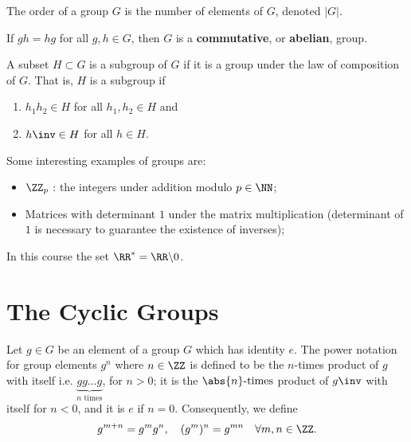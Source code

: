 \documentclass[12pt, a4paper]{article}
\begin{document}
\begin{definition}
    The order of a group \(G\) is the number of elements of \(G\), denoted \(\left|G\right|\).
\end{definition}

\begin{definition}
    If \(gh=hg\) for all \(g,h \in G\), then \(G\) is a \textbf{commutative}, or \textbf{abelian}, group.
\end{definition}

\begin{definition}
    A subset \(H \subset G\) is a subgroup of \(G\) if it is a group under the law of composition of \(G\). That is, \(H\) is a subgroup if 
    \begin{enumerate}
        \item \(h_1h_2 \in H\) for all \(h_1,h_2 \in H\) and
        \item \(h\inv \in H\) for all \(h \in H\).
    \end{enumerate}
\end{definition}

\begin{mdexample}
    Some interesting examples of groups are:
    \begin{itemize}
        \item \(\ZZ_p\) : the integers under addition modulo \(p \in \NN\);
        \item Matrices with determinant \(1\) under the matrix multiplication (determinant of \(1\) is necessary to guarantee the existence of inverses);
    \end{itemize}
\end{mdexample}

\begin{mdnote}
    In this course the set \(\RR^* = \RR \backslash {0}\).
\end{mdnote}

\pagebreak

\section{The Cyclic Groups}

Let \(g\in G\) be an element of a group \(G\) which has identity \(e\). The power notation for group elements \(g^n\) where \(n \in \ZZ\) is defined to be the \(n\)-times product of \(g\) with itself i.e. \(\underbrace{gg\ldots g}_{n \text{ times}}\), for \(n>0\); it is the \(\abs{n}\text{-times}\) product of \(g\inv\) with itself for \(n<0\), and it is \(e\) if \(n=0.\) Consequently, we define 
\[g^{m+n}=g^mg^n, \quad (g^m)^n = g^{mn} \quad \forall m,n \in \ZZ.\]
\end{document}
